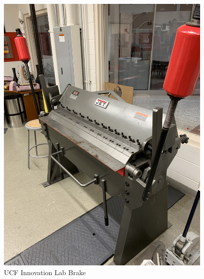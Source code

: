 \begin{figure}[ht]
\begin{minipage}[b]{.48\textwidth}
  \includegraphics[width=0.95\textwidth]{Meetings/November/11-01-21/11-1-21_Hardware_Figure4 - Nathan Forrer.JPG}
  \caption{UCF Innovation Lab Brake}
  \label{fig:pic7}
\end{minipage}
\end{figure}

